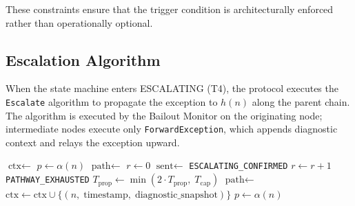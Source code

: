 These constraints ensure that the trigger condition is architecturally enforced rather than operationally optional.

\subsection{Escalation Algorithm}\label{sec:escalation-algorithm}

When the state machine enters ESCALATING (T4), the protocol executes the \texttt{Escalate} algorithm to propagate the exception to $h(n)$ along the parent chain. The algorithm is executed by the Bailout Monitor on the originating node; intermediate nodes execute only \texttt{ForwardException}, which appends diagnostic context and relays the exception upward.

\begin{algorithm}[htbp]
\caption{Bailout Protocol escalation algorithm.}
\label{alg:escalate}
\begin{algorithmic}[1]
  \State $\text{ctx} \leftarrow$ 
  \State $p \leftarrow \alpha(n)$ 
  \State $\text{path} \leftarrow$ 
  \State $r \leftarrow 0$ 
    \State $\text{sent} \leftarrow$ 
      \State \Return \texttt{ESCALATING\_CONFIRMED}
    \EndIf
    \State $r \leftarrow r + 1$
      \State {}
      \State {}
      \State \Return \texttt{PATHWAY\_EXHAUSTED}
    \EndIf
    \State $T_{\text{prop}} \leftarrow \min(2 \cdot T_{\text{prop}},\; T_{\text{cap}})$
    \State {}
    \State $\text{path} \leftarrow$  
  \EndWhile
\EndProcedure
\Statex
{}
  \State $\text{ctx} \leftarrow \text{ctx} \cup \{(n,\; \text{timestamp},\; \text{diagnostic\_snapshot})\}$
  \State $p \leftarrow \alpha(n)$
  \State {}
\EndProcedure
\Statex
{}
  \State \Return {}
\EndProcedure
\end{algorithmic}
\end{algorithm}

